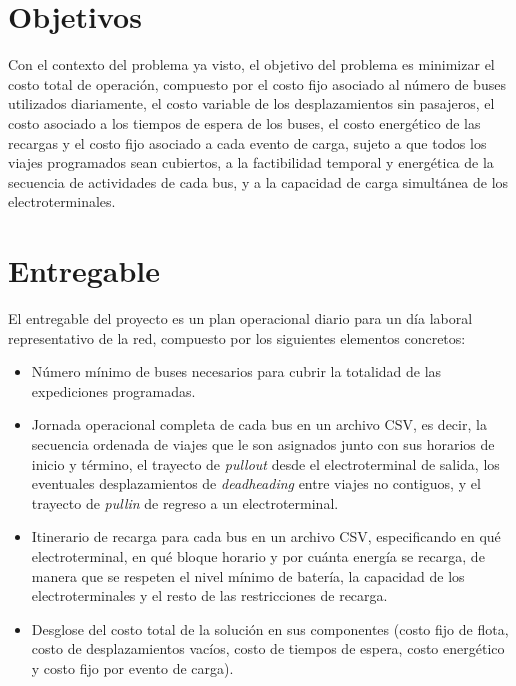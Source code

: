 \section{Objetivos \label{sec:objetivos}}

Con el contexto del problema ya visto, el objetivo del problema es minimizar el costo total de operaci\'on, compuesto por el costo fijo asociado al n\'umero de buses utilizados diariamente, el costo variable de los desplazamientos sin pasajeros, el costo asociado a los tiempos de espera de los buses, el costo energ\'etico de las recargas y el costo fijo asociado a cada evento de carga, sujeto a que todos los viajes programados sean cubiertos, a la factibilidad temporal y energ\'etica de la secuencia de actividades de cada bus, y a la capacidad de carga simult\'anea de los electroterminales.

\section{Entregable \label{sec:entregable}}

El entregable del proyecto es un plan operacional diario para un d\'ia laboral representativo de la red, compuesto por los siguientes elementos concretos:

\begin{itemize}
\item N\'umero m\'inimo de buses necesarios para cubrir la totalidad de las expediciones programadas.
\item Jornada operacional completa de cada bus en un archivo CSV, es decir, la secuencia ordenada de viajes que le son asignados junto con sus horarios de inicio y t\'ermino, el trayecto de \emph{pullout} desde el electroterminal de salida, los eventuales desplazamientos de \emph{deadheading} entre viajes no contiguos, y el trayecto de \emph{pullin} de regreso a un electroterminal.
\item Itinerario de recarga para cada bus en un archivo CSV, especificando en qu\'e electroterminal, en qu\'e bloque horario y por cu\'anta energ\'ia se recarga, de manera que se respeten el nivel m\'inimo de bater\'ia, la capacidad de los electroterminales y el resto de las restricciones de recarga.
\item Desglose del costo total de la soluci\'on en sus componentes (costo fijo de flota, costo de desplazamientos vac\'ios, costo de tiempos de espera, costo energ\'etico y costo fijo por evento de carga).
\end{itemize}

